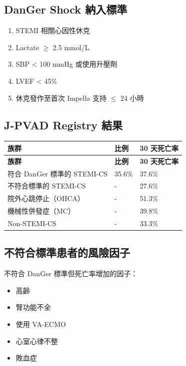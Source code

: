 \documentclass[12pt,a4paper]{article}
\begin{document}
\subsection{DanGer Shock 納入標準}

\begin{enumerate}
    \item STEMI 相關心因性休克
    \item Lactate $\geq$ 2.5 mmol/L
    \item SBP < 100 mmHg 或使用升壓劑
    \item LVEF < 45\%
    \item 休克發作至首次 Impella 支持 $\leq$ 24 小時
\end{enumerate}

\subsection{J-PVAD Registry 結果}

\begin{longtable}{p{5cm}p{4cm}p{4cm}}
\toprule
\textbf{族群} & \textbf{比例} & \textbf{30 天死亡率} \\
\midrule
\endfirsthead
\midrule
\textbf{族群} & \textbf{比例} & \textbf{30 天死亡率} \\
\midrule
\endhead
\bottomrule
\endfoot
符合 DanGer 標準的 STEMI-CS & 35.6\% & 37.6\% \\
\midrule
不符合標準的 STEMI-CS & - & 27.6\% \\
\midrule
院外心跳停止（OHCA） & - & 51.3\% \\
\midrule
機械性併發症（MC） & - & 39.8\% \\
\midrule
Non-STEMI-CS & - & 33.3\% \\
\bottomrule
\end{longtable}

\subsection{不符合標準患者的風險因子}

不符合 DanGer 標準但死亡率增加的因子：
\begin{itemize}
    \item 高齡
    \item 腎功能不全
    \item 使用 VA-ECMO
    \item 心室心律不整
    \item 敗血症
\end{itemize}
\end{document}
